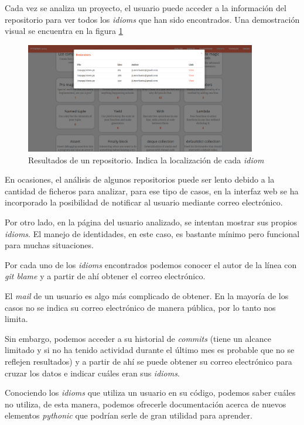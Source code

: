 \documentclass[a4paper, 12pt]{book}
\begin{document}
Cada vez se analiza un proyecto, el usuario puede acceder a la información del repositorio para ver todos los \textit{idioms} que han sido encontrados. Una demostración visual se encuentra en la figura \ref{fig:resultrepo}

\begin{figure}[H]
    \centering
    \includegraphics[width=0.9\textwidth]{img/1result_Repo2.png}
    \caption{Resultados de un repositorio. Indica la localización de cada \textit{idiom}}
    \label{fig:resultrepo}
\end{figure}

En ocasiones, el análisis de algunos repositorios puede ser lento debido a la cantidad de ficheros para analizar, para ese tipo de casos, en la interfaz web se ha incorporado la posibilidad de notificar al usuario mediante correo electrónico.

Por otro lado, en la página del usuario analizado, se intentan mostrar sus propios \textit{idioms}. El manejo de identidades, en este caso, es bastante mínimo pero funcional para muchas situaciones.

Por cada uno de los \textit{idioms} encontrados podemos conocer el autor de la línea con \textit{git blame} y a partir de ahí obtener el correo electrónico. 

El \textit{mail} de un usuario es algo más complicado de obtener. En la mayoría de los casos no se indica su correo electrónico de manera pública, por lo tanto nos limita.

Sin embargo, podemos acceder a su historial de \textit{commits} (tiene un alcance limitado y si no ha tenido actividad durante el último mes es probable que no se reflejen resultados) y a partir de ahí se puede obtener su correo electrónico para cruzar los datos e indicar cuáles eran sus \textit{idioms}.

Conociendo los \textit{idioms} que utiliza un usuario en su código, podemos saber cuáles no utiliza, de esta manera, podemos ofrecerle documentación acerca de nuevos elementos \textit{pythonic} que podrían serle de gran utilidad para aprender.
\end{document}
